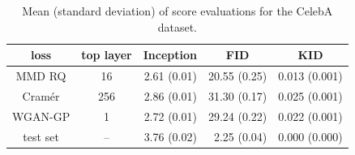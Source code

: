 \documentclass[xcolor={table}]{beamer}
\begin{document}
\begin{frame}{}
\begin{columns}[T, totalwidth=\textwidth]
\begin{column}{.32\textwidth}
\begin{sidefigure4}
      \caption{\textbf{$160 \times 160$ CelebA dataset.} \\
               Samples from
               MMD GAN (left) and WGAN-GP (right) trained with ResNet generator and DCGAN critic.\\
               \vspace*{95pt}
               \textbf{$64 \times 64$ LSUN bedroom dataset.}\\
               Samples from 
               MMD GAN (left) and WGAN-GP (right) models trained with DCGAN 
               architecture with \emph{small critic}\\ ($4\times$ less convolutional filters) .%
               }
    \end{sidefigure4}
    \vspace*{-1.3cm}
    \begin{table}
      \centering
      \vspace{-1cm}
      \caption{Mean (standard deviation) of score evaluations for the CelebA dataset.}
      \label{tab:celeba-scores}
      \begin{tabular}{cc|rrr}
        loss & top layer & \multicolumn{1}{c}{Inception} & \multicolumn{1}{c}{FID} & \multicolumn{1}{c}{KID} \\
        \hline
        MMD RQ   &   16 &    2.61  (0.01) &   20.55  (0.25) &   0.013  (0.001)\\
        Cram\'er &  256 &    2.86  (0.01) &   31.30  (0.17) &   0.025  (0.001)\\
        WGAN-GP  & 1    &    2.72  (0.01) &   29.24  (0.22) &   0.022  (0.001)\\
        test set & --   &    3.76  (0.02) &    2.25  (0.04) &   0.000  (0.000)\\
    \end{tabular}
\end{table}
  \end{column}


\end{columns}
\end{frame}
\end{document}

